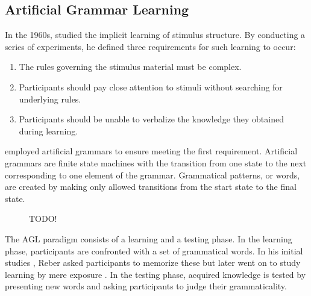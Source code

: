 \subsection{Artificial Grammar Learning}
In the 1960s, \citeauthor{reber1967implicit} studied the implicit learning of stimulus structure. By conducting a series of experiments, he defined three requirements \citep[p.~190]{reber1978analogic} for such learning to occur:
\begin{enumerate}
\item The rules governing the stimulus material must be complex.
\item Participants should pay close attention to stimuli without searching for underlying rules.
\item Participants should be unable to verbalize the knowledge they obtained during learning. 
\end{enumerate}
\citeauthor{reber1967implicit} employed artificial grammars to ensure meeting the first requirement. Artificial grammars are finite state machines with the transition from one state to the next corresponding to one element of the grammar. Grammatical patterns, or words, are created by making only allowed transitions from the start state to the final state. 
\begin{figure}
\centering
{}
\caption{TODO!}
\end{figure}
The AGL paradigm consists of a learning and a testing phase. In the learning phase, participants are confronted with a set of grammatical words. In his initial studies \citep{reber1967implicit}, Reber asked participants to memorize these but later went on to study learning by mere exposure \citep{reber1978analogic}. In the testing phase, acquired knowledge is tested by presenting new words and asking participants to judge their grammaticality. 
